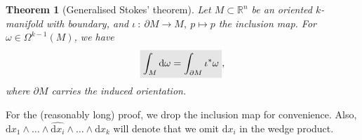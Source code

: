 \documentclass[letter-paper]{tufte-book}
\newtheorem{theorem}{\color{pastel-blue}Theorem}[section]
\newcommand{\highlight}[1]{\mathchoice%
  {\colorbox{black!10}{$\displaystyle#1$}}%
  {\colorbox{black!10}{$\textstyle#1$}}%
  {\colorbox{black!10}{$\scriptstyle#1$}}%
  {\colorbox{black!10}{$\scriptscriptstyle#1$}}}%
\begin{document}
\begin{theorem}[Generalised Stokes' theorem]
  Let $M \subset \mathbb{R}^n$ be an oriented $k$-manifold with boundary, and $\iota\ :\ \partial M \to M,\ p \mapsto p$ the inclusion map. For $\omega \in \Omega^{k-1}(M)$, we have
  \begin{equation}\label{thm:stokes}
    \highlight{\int_M \mathrm{d}\omega = \int_{\partial M} \iota^* \omega},
  \end{equation}
  where $\partial M$ carries the induced orientation.
\end{theorem}

For the (reasonably long) proof, we drop the inclusion map for convenience. Also, $\mathrm{d}x_1 \wedge \ldots \wedge \widehat{\mathrm{d}x_i} \wedge \ldots \wedge \mathrm{d}x_k$ will denote that we omit $\mathrm{d}x_i$ in the wedge product.
\end{document}
